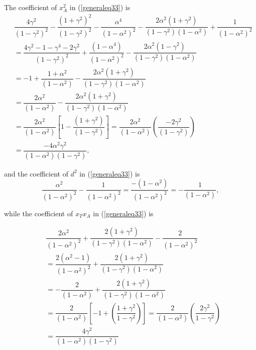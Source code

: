 \documentclass[final,5p,times,twocolumn]{elsarticle}
\begin{document}
The coefficient of $x_A^2$ in (\ref{generaleq33}) is
\begin{equation}
\begin{split}
&\dfrac{4\gamma^{2}}{(1-\gamma^{2})^{2}}-\dfrac{(1+\gamma^{2})^{2}}{(1-\gamma^{2})^{2}}-\dfrac{\alpha^{4}}{(1-\alpha^{2})^{2}}-\dfrac{2\alpha^{2}(1+\gamma^{2})}{(1-\gamma^{2})(1-\alpha^{2})}+\dfrac{1}{(1-\alpha^{2})^{2}}\\
&=\dfrac{4\gamma^{2}-1-\gamma^{4}-2\gamma^2}{(1-\gamma^2)^2} + \dfrac{(1-\alpha^4)}{(1-\alpha^2)^2} - \dfrac{2\alpha^{2}(1-\gamma^2)}{(1-\gamma^2)(1-\alpha^2)}\\
&=-1 + \dfrac{1+\alpha^2}{(1-\alpha^2)}- \dfrac{2 \alpha^2 (1+\gamma^2)}{(1-\gamma^2)(1-\alpha^2)}\\
&= \dfrac{2\alpha^2}{(1-\alpha^2)} - \dfrac{2 \alpha^2 (1+\gamma^2)}{(1-\gamma^2)(1-\alpha^2)}\\
&= \dfrac{2 \alpha^2}{(1-\alpha^2)}[1-\dfrac{(1+\gamma^2)}{(1-\gamma^2)}] = \dfrac{2\alpha^2}{(1-\alpha^2)}(\dfrac{-2\gamma^2}{(1-\gamma^2)})\\
&= \dfrac{-4 \alpha^{2} \gamma^2}{(1-\alpha^2)(1-\gamma^2)},
\end{split}
\end{equation}

and the coefficient of $d^2$ in (\ref{generaleq33}) is
\begin{equation}
\dfrac{\alpha^{2}}{(1-\alpha^{2})^{2}}- \dfrac{1}{(1-\alpha^{2})^{2}}
= \dfrac{-(1-\alpha^2)}{(1-\alpha^2)^2} = -\dfrac{1}{(1-\alpha^2)},
\end{equation}

while the coefficient of $x_T x_A$ in (\ref{generaleq33}) is 

\begin{equation}
\begin{split}
&\dfrac{2\alpha^{2}}{(1-\alpha^{2})^{2}}+\dfrac{2(1+\gamma^{2})}{(1-\gamma^{2})(1-\alpha^{2})}-\dfrac{2}{(1-\alpha^{2})^{2}}\\
&= \dfrac{2(\alpha^{2}-1)}{(1-\alpha^2)^2} + \dfrac{2(1+\gamma^2)}{(1-\gamma^2)(1-\alpha^2)}\\
&= -\dfrac{2}{(1-\alpha^2)} + \dfrac{2(1+\gamma^2)}{(1-\gamma^2)(1-\alpha^2)}\\
&=\dfrac{2}{(1-\alpha^2)}[-1 + (\dfrac{1+\gamma^2}{1-\gamma^2})] = \dfrac{2}{(1-\alpha^2)}(\dfrac{2\gamma^2}{1-\gamma^2})\\
&=\dfrac{4\gamma^2}{(1-\alpha^2)(1-\gamma^2)}
\end{split}
\end{equation}
\end{document}
